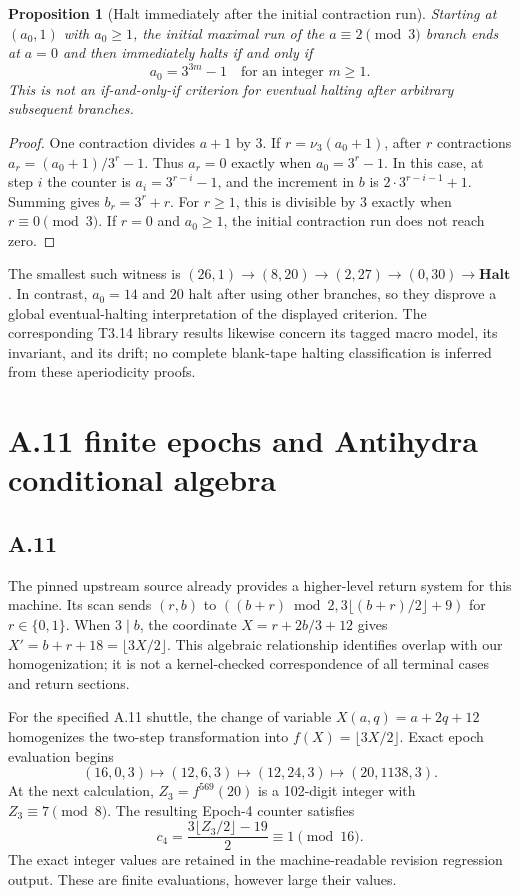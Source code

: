 \documentclass[11pt]{article}
\DeclareRobustCommand{\_}{\ifmmode\sb\else\textunderscore\allowbreak\fi}
\newtheorem{proposition}[theorem]{Proposition}
\theoremstyle{definition}
\theoremstyle{remark}
\newcommand{\Halt}{\mathbf{Halt}}
\begin{document}
\begin{proposition}[Halt immediately after the initial contraction run]
Starting at $(a_0,1)$ with $a_0\ge1$, the initial maximal run of the $a\equiv2\pmod3$ branch ends at $a=0$ and then immediately halts if and only if
\[
a_0=3^{3m}-1\quad\text{for an integer }m\ge1.
\]
This is not an if-and-only-if criterion for eventual halting after arbitrary subsequent branches.
\end{proposition}
\begin{proof}
One contraction divides $a+1$ by 3. If $r=\nu_3(a_0+1)$, after $r$ contractions $a_r=(a_0+1)/3^r-1$. Thus $a_r=0$ exactly when $a_0=3^r-1$. In this case, at step $i$ the counter is $a_i=3^{r-i}-1$, and the increment in $b$ is $2\cdot3^{r-i-1}+1$. Summing gives $b_r=3^r+r$. For $r\ge1$, this is divisible by 3 exactly when $r\equiv0\pmod3$. If $r=0$ and $a_0\ge1$, the initial contraction run does not reach zero.
\end{proof}
The smallest such witness is $(26,1)\to(8,20)\to(2,27)\to(0,30)\to\Halt$. In contrast, $a_0=14$ and $20$ halt after using other branches, so they disprove a global eventual-halting interpretation of the displayed criterion. The corresponding T3.14 library results likewise concern its tagged macro model, its invariant, and its drift; no complete blank-tape halting classification is inferred from these aperiodicity proofs.

\section{A.11 finite epochs and Antihydra conditional algebra}
\label{sec:conditional}
\subsection{A.11}
The pinned upstream source already provides a higher-level return system for this machine. Its scan sends $(r,b)$ to $((b+r)\bmod2,3\lfloor(b+r)/2\rfloor+9)$ for $r\in\{0,1\}$. When $3\mid b$, the coordinate $X=r+2b/3+12$ gives $X'=b+r+18=\lfloor3X/2\rfloor$. This algebraic relationship identifies overlap with our homogenization; it is not a kernel-checked correspondence of all terminal cases and return sections.

For the specified A.11 shuttle, the change of variable $X(a,q)=a+2q+12$ homogenizes the two-step transformation into $f(X)=\lfloor3X/2\rfloor$. Exact epoch evaluation begins
\[
(16,0,3)\longmapsto(12,6,3)\longmapsto(12,24,3)
\longmapsto(20,1138,3).
\]
At the next calculation, $Z_3=f^{569}(20)$ is a 102-digit integer with $Z_3\equiv7\pmod8$. The resulting Epoch-4 counter satisfies
\[
c_4=\frac{3\lfloor Z_3/2\rfloor-19}{2}\equiv1\pmod{16}.
\]
The exact integer values are retained in the machine-readable revision regression output. These are finite evaluations, however large their values.
\end{document}
